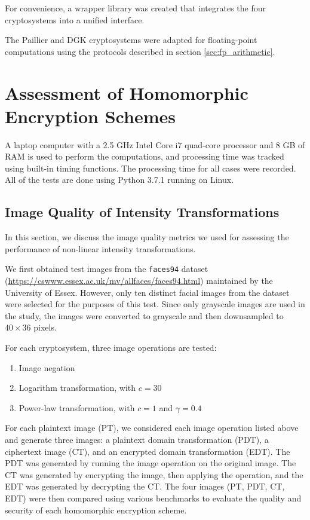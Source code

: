 For convenience, a wrapper library was created that integrates the four cryptosystems into a unified interface.

The Paillier and DGK cryptosystems were adapted for floating-point computations using the protocols described in section \ref{sec:fp_arithmetic}.



\section{Assessment of Homomorphic Encryption Schemes}

A laptop computer with a 2.5 GHz Intel Core i7 quad-core processor and 8 GB of RAM is used to perform the computations, and processing time was tracked using built-in timing functions. The processing time for all cases were recorded. All of the tests are done using Python 3.7.1 running on Linux.

\subsection{Image Quality of Intensity Transformations}
In this section, we discuss the image quality metrics we used for assessing the performance of non-linear intensity transformations.

We first obtained test images from the \texttt{faces94} dataset (\url{https://cswww.essex.ac.uk/mv/allfaces/faces94.html}) maintained by the University of Essex. However, only ten distinct facial images from the dataset were selected for the purposes of this test. Since only grayscale images are used in the study, the images were converted to grayscale and then downsampled to $40 \times 36$ pixels.

For each cryptosystem, three image operations are tested:
\begin{enumerate}
	\item Image negation
	\item Logarithm transformation, with $c = 30$
	\item Power-law transformation, with $c = 1$ and $\gamma = 0.4$
\end{enumerate}

For each plaintext image (PT), we considered each image operation listed above and generate three images: a plaintext domain transformation (PDT), a ciphertext image (CT), and an encrypted domain transformation (EDT). The PDT was generated by running the image operation on the original image. The CT was generated by encrypting the image, then applying the operation, and the EDT was generated by decrypting the CT. The four images (PT, PDT, CT, EDT) were then compared using various benchmarks to evaluate the quality and security of each homomorphic encryption scheme.

